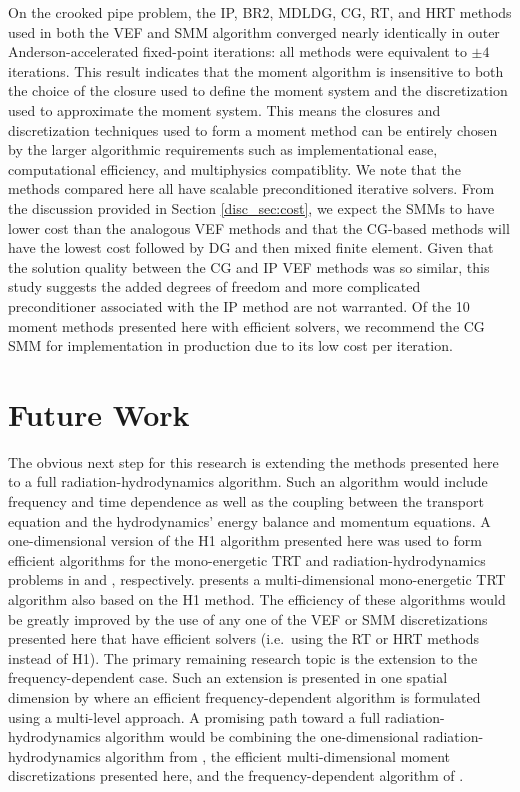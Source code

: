 \documentclass[../doc.tex]{subfiles}
\begin{document}
On the crooked pipe problem, the IP, BR2, MDLDG, CG, RT, and HRT methods used in both the VEF and SMM algorithm converged nearly identically in outer Anderson-accelerated fixed-point iterations: all methods were equivalent to $\pm 4$ iterations. This result indicates that the moment algorithm is insensitive to both the choice of the closure used to define the moment system and the discretization used to approximate the moment system. This means the closures and discretization techniques used to form a moment method can be entirely chosen by the larger algorithmic requirements such as implementational ease, computational efficiency, and multiphysics compatiblity. We note that the methods compared here all have scalable preconditioned iterative solvers. From the discussion provided in Section \ref{disc_sec:cost}, we expect the SMMs to have lower cost than the analogous VEF methods and that the CG-based methods will have the lowest cost followed by DG and then mixed finite element. Given that the solution quality between the CG and IP VEF methods was so similar, this study suggests the added degrees of freedom and more complicated preconditioner associated with the IP method are not warranted. Of the 10 moment methods presented here with efficient solvers, we recommend the CG SMM for implementation in production due to its low cost per iteration. 

\section{Future Work}
The obvious next step for this research is extending the methods presented here to a full radiation-hydrodynamics algorithm. Such an algorithm would include frequency and time dependence as well as the coupling between the transport equation and the hydrodynamics' energy balance and momentum equations. 
A one-dimensional version of the H1 algorithm presented here was used to form efficient algorithms for the mono-energetic TRT and radiation-hydrodynamics problems in \textcite{LOU2019258} and \textcite{LOU2021110393}, respectively. \textcite{yee_mc21} presents a multi-dimensional mono-energetic TRT algorithm also based on the H1 method. The efficiency of these algorithms would be greatly improved by the use of any one of the VEF or SMM discretizations presented here that have efficient solvers (i.e.~using the RT or HRT methods instead of H1). 
The primary remaining research topic is the extension to the frequency-dependent case. Such an extension is presented in one spatial dimension by \textcite{anistratov2020nonlinear,ANISTRATOV2019186} where an efficient frequency-dependent algorithm is formulated using a multi-level approach. A promising path toward a full radiation-hydrodynamics algorithm would be combining the one-dimensional radiation-hydrodynamics algorithm from \textcite{LOU2021110393}, the efficient multi-dimensional moment discretizations presented here, and the frequency-dependent algorithm of \textcite{anistratov2020nonlinear,ANISTRATOV2019186}. 
\end{document}
